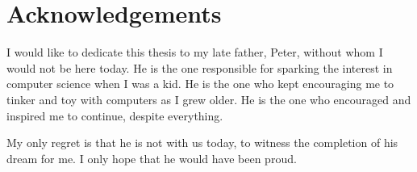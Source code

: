 \chapter{Acknowledgements}
	I would like to dedicate this thesis to my late father, Peter, without whom I would not be here today. He is the one responsible for sparking the interest in computer science when I was a kid. He is the one who kept encouraging me to tinker and toy with computers as I grew older. He is the one who encouraged and inspired me to continue, despite everything.

	My only regret is that he is not with us today, to witness the completion of his dream for me. I only hope that he would have been proud.